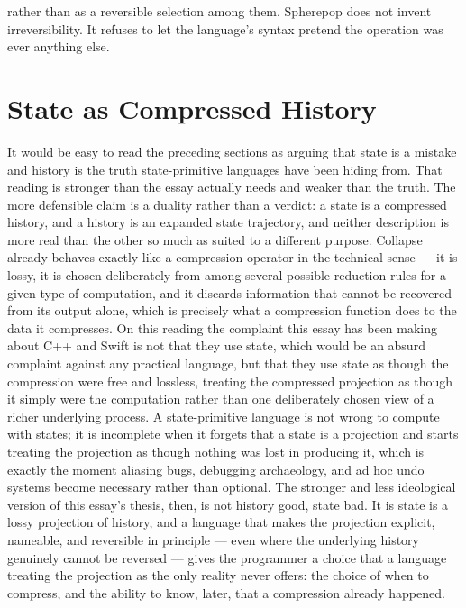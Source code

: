 \documentclass[11pt]{article}
\begin{document}
rather than as a reversible selection among them. Spherepop does not invent irreversibility. It refuses to let the language's syntax pretend the operation was ever anything else.

\section{State as Compressed History}

It would be easy to read the preceding sections as arguing that state is a mistake and history is the truth state-primitive languages have been hiding from. That reading is stronger than the essay actually needs and weaker than the truth. The more defensible claim is a duality rather than a verdict: a state is a compressed history, and a history is an expanded state trajectory, and neither description is more real than the other so much as suited to a different purpose. Collapse already behaves exactly like a compression operator in the technical sense --- it is lossy, it is chosen deliberately from among several possible reduction rules for a given type of computation, and it discards information that cannot be recovered from its output alone, which is precisely what a compression function does to the data it compresses. On this reading the complaint this essay has been making about C++ and Swift is not that they use state, which would be an absurd complaint against any practical language, but that they use state as though the compression were free and lossless, treating the compressed projection as though it simply were the computation rather than one deliberately chosen view of a richer underlying process. A state-primitive language is not wrong to compute with states; it is incomplete when it forgets that a state is a projection and starts treating the projection as though nothing was lost in producing it, which is exactly the moment aliasing bugs, debugging archaeology, and ad hoc undo systems become necessary rather than optional. The stronger and less ideological version of this essay's thesis, then, is not history good, state bad. It is state is a lossy projection of history, and a language that makes the projection explicit, nameable, and reversible in principle --- even where the underlying history genuinely cannot be reversed --- gives the programmer a choice that a language treating the projection as the only reality never offers: the choice of when to compress, and the ability to know, later, that a compression already happened.
\end{document}
